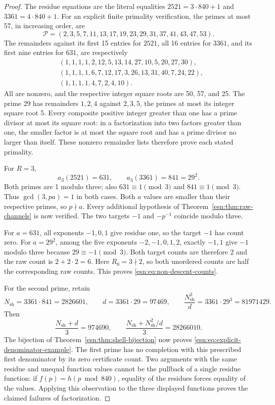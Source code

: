 \begin{proof}
The residue equations are the literal equalities
\(2521=3\cdot840+1\) and \(3361=4\cdot840+1\).
For an explicit finite primality verification, the primes at most 57,
in increasing order, are
\[
 \mathcal P=(2,3,5,7,11,13,17,19,23,29,31,37,41,43,47,53).
\]
The remainders against its first 15 entries for \(2521\), all 16
entries for \(3361\), and its first nine entries for \(631\), are
respectively
\[
\begin{split}
 &(1,1,1,1,2,12,5,13,14,27,10,5,20,27,30),\\
 &(1,1,1,1,6,7,12,17,3,26,13,31,40,7,24,22),\\
 &(1,1,1,1,4,7,2,4,10).
\end{split}
\]
All are nonzero, and the respective integer square roots are 50, 57,
and 25.  The prime 29 has remainders \(1,2,4\) against \(2,3,5\),
the primes at most its integer square root 5.
Every composite positive integer greater than one has a prime divisor
at most its square root: in a factorization into two factors greater
than one, the smaller factor is at most the square root and has a prime
divisor no larger than itself.  These nonzero remainder lists therefore
prove each stated primality.

For \(R=3\),
\[
 a_3(2521)=631,\qquad a_3(3361)=841=29^2.
\]
Both primes are 1 modulo three; also \(631\equiv1\pmod3\) and
\(841\equiv1\pmod3\).  Thus \(\gcd(3,pa)=1\) in both cases.
Both \(a\) values are smaller than their respective primes, so
\(p\nmid a\).  Every additional hypothesis of
Theorem~\ref{esn:thm:raw-channels} is now verified.
The two targets \(-1\) and \(-p^{-1}\) coincide modulo three.

For \(a=631\), all exponents \(-1,0,1\) give residue one, so
the target \(-1\) has count zero.  For \(a=29^2\), among the five
exponents \(-2,-1,0,1,2\), exactly \(-1,1\) give \(-1\) modulo
three because \(29\equiv-1\pmod3\).  Both target counts are
therefore 2 and the raw count is \(2+2\cdot2=6\).  Here
\(R_0=3\nmid2\), so both unordered counts are half the corresponding
raw counts.  This proves \eqref{esn:eq:non-descent-counts}.

For the second prime, retain
\[
 N_{\mathrm{sh}}=3361\cdot841=2826601,
 \qquad d=3361\cdot29=97469,
 \qquad \frac{N_{\mathrm{sh}}^2}{d}=3361\cdot29^3=81971429.
\]
Then
\[
 \frac{N_{\mathrm{sh}}+d}{3}=974690,
 \qquad
 \frac{N_{\mathrm{sh}}+N_{\mathrm{sh}}^2/d}{3}=28266010.
\]
The bijection of Theorem~\ref{esn:thm:shell-bijection} now proves
\eqref{esn:eq:explicit-denominator-example}.  The first prime has
no completion with this prescribed first denominator by its zero
certificate count.  Two arguments with the same residue and unequal
function values cannot be the pullback of a single residue function:
if \(f(p)=h(p\bmod840)\), equality of the residues forces equality
of the values.  Applying this observation to the three displayed
functions proves the claimed failures of factorization.
\end{proof}

